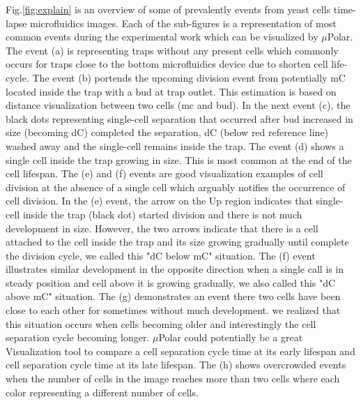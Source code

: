 \documentclass[conference]{IEEEtran}
\begin{document}
Fig.\ref{fig:explain} is an overview of some of prevalently events from yeast cells time-lapse microfluidics images. Each of the sub-figures is a representation of most common events during the experimental work which can be visualized by $\mu$Polar. The event (a) is representing traps without any present cells which commonly occurs for traps close to the bottom microfluidics device due to shorten cell life-cycle. The event (b) portends the upcoming division event from potentially mC located inside the trap with a bud at trap outlet. This estimation is based on distance visualization between two cells (mc and bud). In the next event (c), the black dots representing single-cell separation that occurred after bud increased in size (becoming dC) completed the separation, dC (below red reference line) washed away and the single-cell remains inside the trap. The event (d) shows a single cell inside the trap growing in size. This is most common at the end of the cell lifespan. The (e) and (f) events are good visualization examples of cell division at the absence of a single cell which arguably notifies the occurrence of cell division. In the (e) event, the arrow on the Up region indicates that single-cell inside the trap (black dot) started division and there is not much development in size. However, the two arrows indicate that there is a cell attached to the cell inside the trap and its size growing gradually until complete the division cycle, we called this "dC below mC" situation. The (f) event illustrates similar development in the opposite direction when a single call is in steady position and cell above it is growing gradually, we also called this "dC above mC" situation. The (g) demonstrates an event there two cells have been close to each other for sometimes without much development. we realized that this situation occurs when cells becoming older and interestingly the cell separation cycle becoming longer. $\mu$Polar could potentially be a great Visualization tool to compare a cell separation cycle time at its early lifespan and cell separation cycle time at its late lifespan. The (h) shows overcrowded events when the number of cells in the image reaches more than two cells where each color representing a different number of cells.
\end{document}
